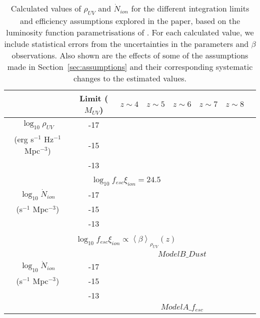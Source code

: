 \begin{table*}\label{tab:finkelstein_N}
  \caption{Calculated values of $\rho_{UV}$ and $\dot{N}_{ion}$ for the different integration limits and efficiency assumptions explored in the paper, based on the luminosity function parametrisations of \citet{Finkelstein:2014ub}. For each calculated value, we include statistical errors from the uncertainties in the \citet{Schechter:1976gl} parameters and $\beta$ observations. Also shown are the effects of some of the assumptions made in Section~\ref{sec:assumptions} and their corresponding systematic changes to the estimated values.}
  \begin{tabular}{cc|cccccc}
   \hline
   & Limit ($M_{UV}$) & $z\sim4$ & $z\sim5$ & $z\sim6$ & $z\sim7$ & $z\sim8$ \\
   \hline
  $\log_{10} \rho_{UV}$ 							& -17 &  \\
   (erg s$^{-1}$ Hz$^{-1}$ Mpc$^{-3}$)	& -15 &  \\
																& -13 &  \\

	 \multicolumn{7}{c}{}\\
	 \multicolumn{7}{c}{$\log_{10}f_{esc}\xi_{ion} = 24.5$}\\\hline
$\log_{10} \dot{N}_{ion}$	 		& -17 &  \\
(s$^{-1}$ Mpc$^{-3}$) 				& -15 &  \\
												& -13 &  \\
												
	 \multicolumn{7}{c}{}\\
	 \multicolumn{7}{c}{$\log_{10}f_{esc}\xi_{ion} \propto \left \langle \beta  \right \rangle_{\rho_{UV}}(z)$}\\ \hline
	
	  & & \multicolumn{5}{c}{$ModelB\_Dust$}\\
	  
$\log_{10} \dot{N}_{ion}$	 		& -17 &  \\
(s$^{-1}$ Mpc$^{-3}$) 				& -15 &  \\
												& -13 &  \\
												
	  & & \multicolumn{5}{c}{$ModelA\_f_{esc}$}\\
	  

\end{tabular}
\end{table*}
